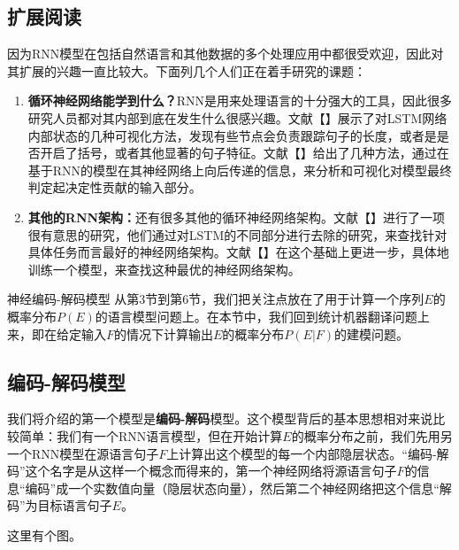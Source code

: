 \documentclass[10pt,a4paper]{ctexart}
\makeatletter
\renewcommand{\section}{\@startsection{section}{1}{0mm}
  {-\baselineskip}{0.5\baselineskip}{\bf\leftline}}
\makeatother
\begin{document}
\subsection{扩展阅读}
因为RNN模型在包括自然语言和其他数据的多个处理应用中都很受欢迎，因此对其扩展的兴趣一直比较大。下面列几个人们正在着手研究的课题：
\begin{enumerate}
\item[] \textbf{循环神经网络能学到什么？}RNN是用来处理语言的十分强大的工具，因此很多研究人员都对其内部到底在发生什么很感兴趣。文献【】展示了对LSTM网络内部状态的几种可视化方法，发现有些节点会负责跟踪句子的长度，或者是是否开启了括号，或者其他显著的句子特征。文献【】给出了几种方法，通过在基于RNN的模型在其神经网络上向后传递的信息，来分析和可视化对模型最终判定起决定性贡献的输入部分。
\item[] \textbf{其他的RNN架构：}还有很多其他的循环神经网络架构。文献【】进行了一项很有意思的研究，他们通过对LSTM的不同部分进行去除的研究，来查找针对具体任务而言最好的神经网络架构。文献【】在这个基础上更进一步，具体地训练一个模型，来查找这种最优的神经网络架构。
\end{enumerate}



\section{神经编码-解码模型}
从第3节到第6节，我们把关注点放在了用于计算一个序列$E$的概率分布$P(E)$的语言模型问题上。在本节中，我们回到统计机器翻译问题上来，即在给定输入$F$的情况下计算输出$E$的概率分布$P(E | F)$的建模问题。

\subsection{编码-解码模型}
我们将介绍的第一个模型是\textbf{编码-解码}模型。这个模型背后的基本思想相对来说比较简单：我们有一个RNN语言模型，但在开始计算$E$的概率分布之前，我们先用另一个RNN模型在源语言句子$F$上计算出这个模型的每一个内部隐层状态。“编码-解码”这个名字是从这样一个概念而得来的，第一个神经网络将源语言句子$F$的信息“编码”成一个实数值向量（隐层状态向量），然后第二个神经网络把这个信息“解码”为目标语言句子$E$。

这里有个图。
\end{document}
